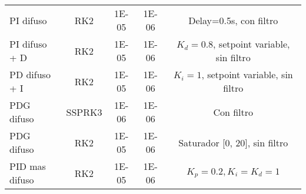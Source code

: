 {\begin{longtable}{l @{\extracolsep{\fill}} cccc}
         PI difuso                  & RK2       & \num{1E-05} & \num{1E-06} & Delay=0.5s, con filtro                    \\
         PI difuso + D              & RK2       & \num{1E-05} & \num{1E-06} & $K_d=0.8$, setpoint variable, sin filtro  \\
         PD difuso + I              & RK2       & \num{1E-05} & \num{1E-06} & $K_i=1$, setpoint variable, sin filtro    \\
         PDG difuso                 & SSPRK3    & \num{1E-06} & \num{1E-06} & Con filtro                                \\
         PDG difuso                 & RK2       & \num{1E-05} & \num{1E-06} & Saturador [0, 20], sin filtro             \\
         PID mas difuso             & RK2       & \num{1E-05} & \num{1E-06} & $K_p=0.2, K_i=K_d=1$                      \\
        \end{longtable}}

